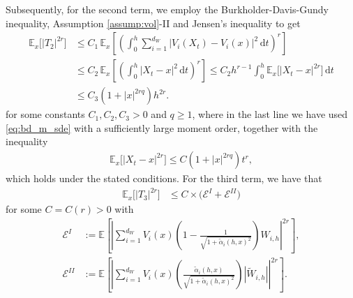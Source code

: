 \documentclass[11pt]{article}
\renewcommand{\d}{\mathrm{d}}
\begin{document}
Subsequently, for the second term, we employ the Burkholder-Davis-Gundy inequality, Assumption \ref{assump:vol}-II and Jensen's inequality to get 
% 
\begin{align*}
\mathbb{E}_x\bigl[|T_2|^{2r}\bigr]
&\leq
C_1\,
\mathbb{E}_x\left[
\left(
\int_0^h
\sum_{i=1}^{d_W}
|V_i(X_t)-V_i(x)|^2\,\d t
\right)^r
\right]
\\
&\leq
C_2\,
\mathbb{E}_x\left[
\left(
\int_0^h |X_t-x|^2\,\d t
\right)^r
\right]
\leq
C_2 h^{r-1}
\int_0^h
\mathbb{E}_x\bigl[|X_t-x|^{2r}\bigr]\,\d t
\\
&\leq
C_3(1+|x|^{2rq})h^{2r}.
\end{align*}
% 
for some constants $C_1, C_2, C_3 > 0$ and $q \ge 1$, where in the last line we have used \eqref{eq:bd_m_sde} with a sufficiently large moment order, together with the inequality
% 
\begin{align} \label{eq:bd_diff_X}
\mathbb{E}_x \bigl[ | X_t - x |^{2r} \bigr] \le C ( 1 + |x|^{2rq}) t^{r},  
\end{align}  
which holds under the stated conditions. 
% 
For the third term, we have that 
% 
% 
\begin{align}
\mathbb{E}_x \bigl[ |T_3|^{2r} \bigr] 
& \le C \times \bigl( \mathcal{E}^I + \mathcal{E}^{II} \bigr)  
\end{align}
% 
for some $C = C(r) > 0 $ with 
\begin{align}
\mathcal{E}^I & := \mathbb{E} \left[ 
\left| \sum_{i = 1}^{d_W} 
V_{i} (x)  \left( 1 - \frac{1}{\sqrt{1 + \tilde{\alpha}_i (h, x)^2}} \right) W_{i, h} \right|^{2r} \right],  \\ 
\mathcal{E}^{II} & := \mathbb{E} \left[ 
\left| \sum_{i = 1}^{d_W} 
V_{i} (x)  \left( \frac{\tilde{\alpha}_i (h, x)}{\sqrt{1 + \tilde{\alpha}_i (h, x)^2}} \right) |\widetilde{W}_{i, h}| \right|^{2r} \right]. 
\end{align} 
\end{document}
